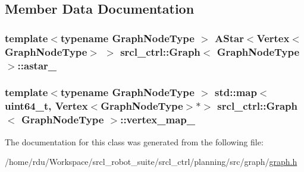 \subsection{Member Data Documentation}
\hypertarget{classsrcl__ctrl_1_1Graph_afb3a6e5c667c05f3edfc87f1ea39577d}{
\subsubsection[{astar\-\_\-}]{\setlength{\rightskip}{0pt plus 5cm}template$<$typename Graph\-Node\-Type $>$ {\bf A\-Star}$<${\bf Vertex}$<$Graph\-Node\-Type$>$ $>$ {\bf srcl\-\_\-ctrl\-::\-Graph}$<$ Graph\-Node\-Type $>$\-::astar\-\_\-\hspace{0.3cm}{\ttfamily [private]}}}\label{classsrcl__ctrl_1_1Graph_afb3a6e5c667c05f3edfc87f1ea39577d}
\hypertarget{classsrcl__ctrl_1_1Graph_a0cdf1fbe36941c5fabc5b2f2c6bfa2ce}{
\subsubsection[{vertex\-\_\-map\-\_\-}]{\setlength{\rightskip}{0pt plus 5cm}template$<$typename Graph\-Node\-Type $>$ std\-::map$<$uint64\-\_\-t, {\bf Vertex}$<$Graph\-Node\-Type$>$$\ast$$>$ {\bf srcl\-\_\-ctrl\-::\-Graph}$<$ Graph\-Node\-Type $>$\-::vertex\-\_\-map\-\_\-\hspace{0.3cm}{\ttfamily [private]}}}\label{classsrcl__ctrl_1_1Graph_a0cdf1fbe36941c5fabc5b2f2c6bfa2ce}


The documentation for this class was generated from the following file\-:\begin{DoxyCompactItemize}
\item 
/home/rdu/\-Workspace/srcl\-\_\-robot\-\_\-suite/srcl\-\_\-ctrl/planning/src/graph/\hyperlink{graph_8h}{graph.\-h}\end{DoxyCompactItemize}
